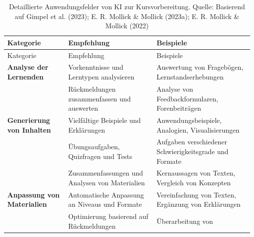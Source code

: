 \documentclass[
  ngerman,
  letterpaper,
  DIV=11]{scrreprt}
\begin{document}
\begin{longtable}[]{@{}
  >{\raggedright\arraybackslash}p{}
  >{\raggedright\arraybackslash}p{}
  >{\raggedright\arraybackslash}p{}@{}}
\caption{Detaillierte Anwendungsfelder von KI zur Kursvorbereitung.
Quelle: Basierend auf Gimpel et al. (2023); E. R. Mollick \& Mollick
(2023a); E. R. Mollick \& Mollick
(2022)}\label{tbl-prep-apps}\tabularnewline
\toprule\noalign{}
\begin{minipage}[b]{\linewidth}\raggedright
Kategorie
\end{minipage} & \begin{minipage}[b]{\linewidth}\raggedright
Empfehlung
\end{minipage} & \begin{minipage}[b]{\linewidth}\raggedright
Beispiele
\end{minipage} \\
\midrule\noalign{}
\endfirsthead
\toprule\noalign{}
\begin{minipage}[b]{\linewidth}\raggedright
Kategorie
\end{minipage} & \begin{minipage}[b]{\linewidth}\raggedright
Empfehlung
\end{minipage} & \begin{minipage}[b]{\linewidth}\raggedright
Beispiele
\end{minipage} \\
\midrule\noalign{}
\endhead
\bottomrule\noalign{}
\endlastfoot
\textbf{Analyse der Lernenden} & Vorkenntnisse und Lerntypen analysieren
& Auswertung von Fragebögen, Lernstandserhebungen \\
& Rückmeldungen zusammenfassen und auswerten & Analyse von
Feedbackformularen, Forenbeiträgen \\
\textbf{Generierung von Inhalten} & Vielfältige Beispiele und
Erklärungen & Anwendungsbeispiele, Analogien, Visualisierungen \\
& Übungsaufgaben, Quizfragen und Tests & Aufgaben verschiedener
Schwierigkeitsgrade und Formate \\
& Zusammenfassungen und Analysen von Materialien & Kernaussagen von
Texten, Vergleich von Konzepten \\
\textbf{Anpassung von Materialien} & Automatische Anpassung an Niveaus
und Formate & Vereinfachung von Texten, Ergänzung von Erklärungen \\
& Optimierung basierend auf Rückmeldungen & Überarbeitung von

\end{longtable}
\end{document}
